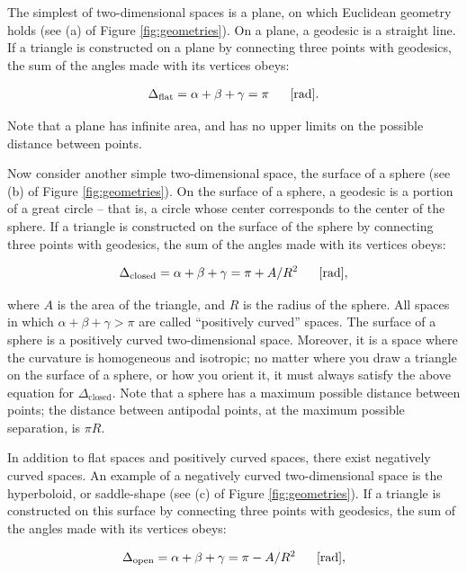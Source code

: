 \documentclass[a4paper,11pt]{article}
\begin{document}
{\noindent}The simplest of two-dimensional spaces is a plane, on which Euclidean geometry holds (see (a) of Figure \ref{fig:geometries}). On a plane, a geodesic is a straight line. If a triangle is constructed on a plane by connecting three points with geodesics, the sum of the angles made with its vertices obeys:

\begin{align*}
    \Delta_\mathrm{flat} = \alpha + \beta + \gamma = \pi ~~~~~[{\rm rad}].
\end{align*}

{\noindent}Note that a plane has infinite area, and has no upper limits on the possible distance between points.

{\noindent}Now consider another simple two-dimensional space, the surface of a sphere (see (b) of Figure \ref{fig:geometries}). On the surface of a sphere, a geodesic is a portion of a great circle -- that is, a circle whose center corresponds to the center of the sphere. If a triangle is constructed on the surface of the sphere by connecting three points with geodesics, the sum of the angles made with its vertices obeys:

\begin{align*}
    \Delta_\mathrm{closed} = \alpha + \beta + \gamma = \pi + A/R^2 ~~~~~[{\rm rad}],
\end{align*}

{\noindent}where $A$ is the area of the triangle, and $R$ is the radius of the sphere. All spaces in which $\alpha + \beta + \gamma > \pi$ are called ``positively curved'' spaces. The surface of a sphere is a positively curved two-dimensional space. Moreover, it is a space where the curvature is homogeneous and isotropic; no matter where you draw a triangle on the surface of a sphere, or how you orient it, it must always satisfy the above equation for $\Delta_\mathrm{closed}$. Note that a sphere has a maximum possible distance between points; the distance between antipodal points, at the maximum possible separation, is $\pi R$.

{\noindent}In addition to flat spaces and positively curved spaces, there exist negatively curved spaces. An example of a negatively curved two-dimensional space is the hyperboloid, or saddle-shape (see (c) of Figure \ref{fig:geometries}). If a triangle is constructed on this surface by connecting three points with geodesics, the sum of the angles made with its vertices obeys:

\begin{align*}
    \Delta_\mathrm{open} = \alpha + \beta + \gamma = \pi - A/R^2 ~~~~~[{\rm rad}],
\end{align*}
\end{document}
